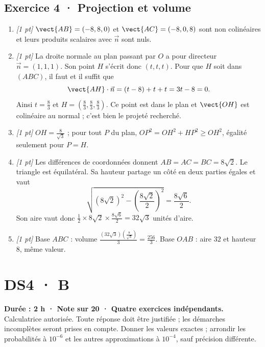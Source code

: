 \subsection*{Exercice 4 · Projection et volume}\begin{enumerate}

\item \textit{[1 pt]} $\vect{AB}=(-8,8,0)$ et $\vect{AC}=(-8,0,8)$ sont non colinéaires et leurs produits scalaires avec $\vec n$ sont nuls.

\item \textit{[1 pt]} La droite normale au plan passant par $O$ a pour directeur $\vec n=(1,1,1)$. Son point $H$ s'écrit donc $(t,t,t)$. Pour que $H$ soit dans $(ABC)$, il faut et il suffit que
\[\vect{AH}\cdot\vec n=(t-8)+t+t=3t-8=0.\]
Ainsi $t=\frac{8}{3}$ et $H=(\frac{8}{3},\frac{8}{3},\frac{8}{3})$. Ce point est dans le plan et $\vect{OH}$ est colinéaire au normal ; c'est bien le projeté recherché.

\item \textit{[1 pt]} $OH=\frac{8}{\sqrt{3}}$ ; pour tout $P$ du plan, $OP^2=OH^2+HP^2\ge OH^2$, égalité seulement pour $P=H$.

\item \textit{[1 pt]} Les différences de coordonnées donnent $AB=AC=BC=8\sqrt2$. Le triangle est équilatéral. Sa hauteur partage un côté en deux parties égales et vaut
\[\sqrt{(8\sqrt2)^2-(\frac{8\sqrt{2}}{2})^2}=\frac{8\sqrt6}{2}.\]
Son aire vaut donc $\frac12\times 8\sqrt2\times\frac{8\sqrt6}{2}=32\sqrt3$ unités d'aire.

\item \textit{[1 pt]} Base $ABC$ : volume $\frac{(32\sqrt3)(\frac{8}{\sqrt{3}})}{3}=\frac{256}{3}$. Base $OAB$ : aire $32$ et hauteur $8$, même valeur.

\end{enumerate}

\fi

\fi

\ifmxteacher

\mxnewpage{}\label{sujet:6-4}

\section*{DS4 · B}


\textbf{Durée : 2 h · Note sur 20 · Quatre exercices indépendants.}\\Calculatrice autorisée. Toute réponse doit être justifiée ; les démarches incomplètes seront prises en compte. Donner les valeurs exactes ; arrondir les probabilités à $10^{-6}$ et les autres approximations à $10^{-4}$, sauf précision différente.

